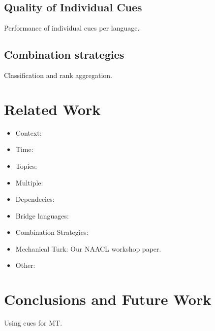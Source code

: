 \documentclass[11pt]{article}
\begin{document}
\subsection{Quality of Individual Cues} 

Performance of individual cues per language.

\subsection{Combination strategies}

Classification and rank aggregation.



\section{Related Work} \label{sect:relwork}

\begin{itemize}
\setlength{\parskip}{0pt}
  \item Context: \cite{Rapp:1995,Rapp:1999,Fung:1998}
  \item Time: \cite{Schafer:2002,Klementiev:2006b}
  \item Topics: \cite{Mimno:2009,Boyd-Graber:2009}
  \item Multiple: \cite{Schafer:2002,Koehn:2000,Haghighi:2008}
  \item Dependecies: \cite{Garera:2009}
  \item Bridge languages: \cite{Mann:2001}
  \item Combination Strategies: \cite{Koehn:2000,Klementiev:2006b,Klementiev:2008a}
  \item Mechanical Turk: Our NAACL workshop paper.
  \item Other: \cite{Monz:2005}
\end{itemize}

\section{Conclusions and Future Work} \label{sect:conclusions}

Using cues for MT.




\end{document}
